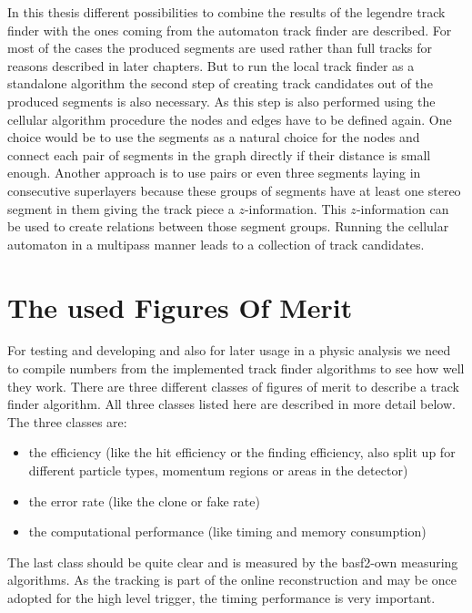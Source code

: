 In this thesis different possibilities to combine the results of the legendre track finder with the ones coming from the automaton track finder are described. For most of the cases the produced segments are used rather than full tracks for reasons described in later chapters. But to run the local track finder as a standalone algorithm the second step of creating track candidates out of the produced segments is also necessary. As this step is also performed using the cellular algorithm procedure the nodes and edges have to be defined again. One choice would be to use the segments as a natural choice for the nodes and connect each pair of segments in the graph directly if their distance is small enough. Another approach is to use pairs or even three segments laying in consecutive superlayers because these groups of segments have at least one stereo segment in them giving the track piece a $z$-information. This $z$-information can be used to create relations between those segment groups. Running the cellular automaton in a multipass manner leads to a collection of track candidates.


\section{The used Figures Of Merit}

For testing and developing and also for later usage in a physic analysis we need to compile numbers from the implemented track finder algorithms to see how well they work. There are three different classes of figures of merit to describe a track finder algorithm. All three classes listed here are described in more detail below. The three classes are:
\begin{itemize}
  \item the efficiency (like the hit efficiency or the finding efficiency, also split up for different particle types, momentum regions or areas in the detector)
  \item the error rate (like the clone or fake rate)
  \item the computational performance (like timing and memory consumption)
\end{itemize}

The last class should be quite clear and is measured by the basf2-own measuring algorithms. As the tracking is part of the online reconstruction and may be once adopted for the high level trigger, the timing performance is very important. 

